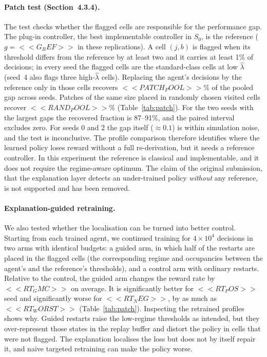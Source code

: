 \paragraph{Patch test (Section~4.3.4).} The test checks whether the flagged cells are responsible for the performance gap. The plug-in controller, the best implementable controller in $S_0$, is the reference ($g=<<G_REF>>$ in these replications). A cell $(j,b)$ is flagged when its threshold differs from the reference by at least two and it carries at least 1\% of decisions; in every seed the flagged cells are the standard-class cells at low $\hat\lambda$ (seed~4 also flags three high-$\hat\lambda$ cells). Replacing the agent's decisions by the reference only in those cells recovers $<<PATCH_POOL>>$\% of the pooled gap across seeds. Patches of the same size placed in randomly chosen visited cells recover $<<RAND_POOL>>$\% (Table~\ref{tab:patch}). For the two seeds with the largest gaps the recovered fraction is 87--91\%, and the paired interval excludes zero. For seeds 0 and 2 the gap itself ($\approx0.1$) is within simulation noise, and the test is inconclusive. The profile comparison therefore identifies where the learned policy loses reward without a full re-derivation, but it needs a reference controller. In this experiment the reference is classical and implementable, and it does not require the regime-aware optimum. The claim of the original submission, that the explanation layer detects an under-trained policy \emph{without} any reference, is not supported and has been removed.

\paragraph{Explanation-guided retraining.} We also tested whether the localisation can be turned into better control. Starting from each trained agent, we continued training for $4\times10^4$ decisions in two arms with identical budgets: a guided arm, in which half of the restarts are placed in the flagged cells (the corresponding regime and occupancies between the agent's and the reference's thresholds), and a control arm with ordinary restarts. Relative to the control, the guided arm changes the reward rate by $<<RT_GMC>>$ on average. It is significantly better for $<<RT_POS>>$ seed and significantly worse for $<<RT_NEG>>$, by as much as $<<RT_WORST>>$ (Table~\ref{tab:patch}). Inspecting the retrained profiles shows why. Guided restarts raise the low-regime thresholds as intended, but they over-represent those states in the replay buffer and distort the policy in cells that were not flagged. The explanation localises the loss but does not by itself repair it, and naive targeted retraining can make the policy worse.

